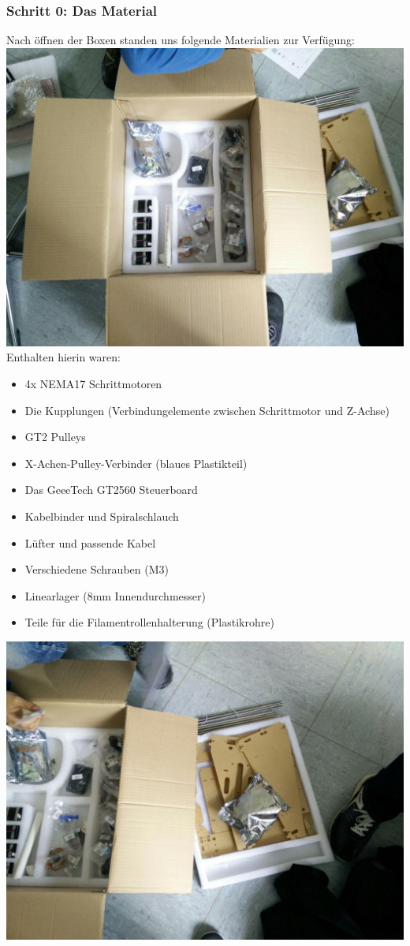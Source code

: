 \subsubsection{Schritt 0: Das Material}
Nach öffnen der Boxen standen uns folgende Materialien zur Verfügung:
\includegraphics[clip=true,trim=230 100 320 100,angle=90,width=\textwidth]{Bilder/Material_1.jpg}
Enthalten hierin waren:
\begin{itemize}[noitemsep]
\item 4x NEMA17 Schrittmotoren
\item Die Kupplungen (Verbindungelemente zwischen Schrittmotor und Z-Achse)
\item GT2 Pulleys
\item X-Achen-Pulley-Verbinder (blaues Plastikteil)
\item Das GeeeTech GT2560 Steuerboard
\item Kabelbinder und Spiralschlauch
\item Lüfter und passende Kabel
\item Verschiedene Schrauben (M3)
\item Linearlager (8mm Innendurchmesser)
\item Teile für die Filamentrollenhalterung (Plastikrohre)
\end{itemize}
\vspace{\linewidth}
\includegraphics[clip=true,trim=410 100 150 100,angle=90,width=\textwidth]{Bilder/Material_2.jpg}

